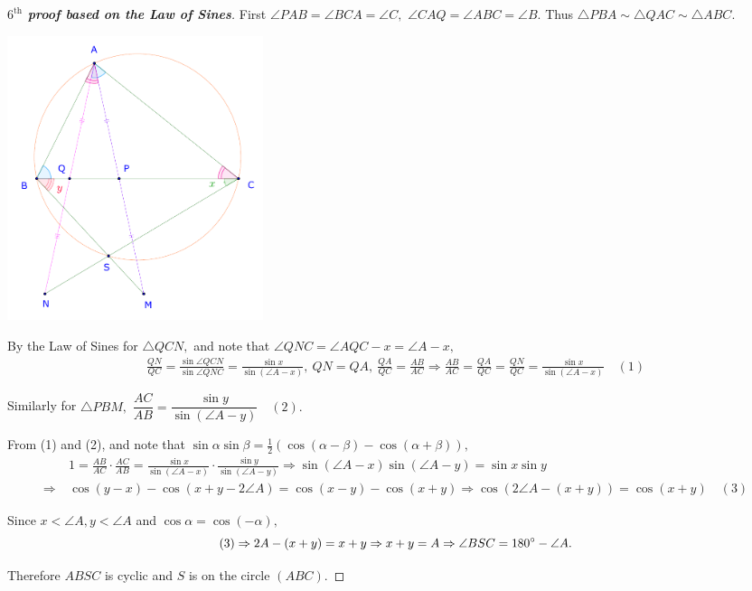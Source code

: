 \documentclass{article}
\begin{document}
\begin{proof}[\textbf{$6^{\text{th}}$ proof based on the Law of Sines}]
    First $\angle PAB = \angle BCA = \angle C,$ $\angle CAQ = \angle ABC = \angle B.$
    Thus $\triangle PBA \sim \triangle QAC \sim \triangle ABC.$
    
    \begin{center}
        \includegraphics[width=7.5cm]{./svg/pdf/ot-22-23-4-e2-s4.pdf}
    \end{center}
    
    By the Law of Sines for $\triangle QCN,$ and note that $\angle QNC = \angle AQC - x = \angle A - x,$
    \[
        \begin{aligned}
            \frac{QN}{QC} = \frac{\sin{\angle QCN}}{\sin{ \angle QNC}} = \frac{\sin{x}}{\sin{(\angle A - x)}},\ QN = QA,\ \frac{QA}{QC} = \frac{AB}{AC}
            \Rightarrow \frac{AB}{AC} = \frac{QA}{QC} = \frac{QN}{QC} = \frac{\sin{x}}{\sin{(\angle A - x)}} \quad (1)
        \end{aligned}
    \]

    Similarly for $\triangle PBM, $ $\dfrac{AC}{AB} = \dfrac{\sin{y}}{\sin{(\angle A - y)}} \quad (2).$
     
    From (1) and (2), and note that $\sin{\alpha} \sin{\beta} = \frac{1}{2} \left( \cos{(\alpha - \beta)} - \cos{(\alpha + \beta)} \right),$
    \[
        \begin{aligned}
            &1 =  \frac{AB}{AC} \cdot \frac{AC}{AB} = \frac{\sin{x}}{\sin{(\angle A - x)}} \cdot \frac{\sin{y}}{\sin{(\angle A - y)}}
            \Rightarrow \sin(\angle A-x)\sin(\angle A-y) = \sin{x} \sin{y} \\
            \Rightarrow\ &\cos{(y-x)} - \cos{(x+y- 2 \angle A)} = \cos{(x-y)} - \cos{(x+y)}
            \Rightarrow \cos{(2 \angle A - (x+y))}  = \cos{(x+y)}  \quad (3)
        \end{aligned}
    \]

    Since $x< \angle A, y<\angle A$ and $\cos{\alpha} = \cos{(-\alpha)},$\
    \[
        (3) \Rightarrow 2A - (x+y) = x+y \Rightarrow x+y = A \Rightarrow \angle BSC = 180^\circ - \angle A.
    \]

    Therefore $ABSC$ is cyclic and $S$ is on the circle $(ABC).$
\end{proof}
\end{document}
